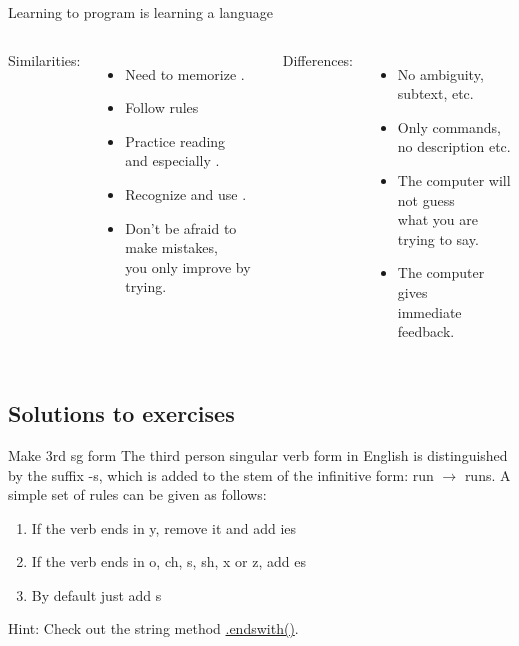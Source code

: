 \documentclass[aspectratio=169,usenames,dvipsnames]{beamer}
\begin{document}
\begin{frame}{Learning to program is learning a language}
\begin{columns}[T]
Similarities:
\begin{itemize}
	\item Need to memorize .
	\item Follow  rules
	\item Practice reading \\
			and especially .
	\item Recognize and use .
	\item Don't be afraid to make mistakes, \\
		you only improve by trying.
\end{itemize}
\pause Differences:
\pause
\begin{itemize}
	\item No ambiguity, subtext, etc.
	\item Only commands, \\
        no description etc.
	\item The computer will not guess \\
        what you are trying to say.
	\item The computer gives \\
        immediate feedback.
\end{itemize}
\end{columns}
\end{frame}


\subsection{Solutions to exercises}
\begin{frame}{Make 3rd sg form}
The third person singular verb form in English is distinguished by the suffix
-s, which is added to the stem of the infinitive form: run $\rightarrow$ runs.
A simple set of rules can be given as follows:
\begin{enumerate}
    \item If the verb ends in y, remove it and add ies
    \item If the verb ends in o, ch, s, sh, x or z, add es
    \item By default just add s
\end{enumerate}

\vspace{1em}
Hint: Check out the string method \href{https://docs.python.org/3/library/stdtypes.html\#str.endswith}{.endswith()}.
\end{frame}
\end{document}
